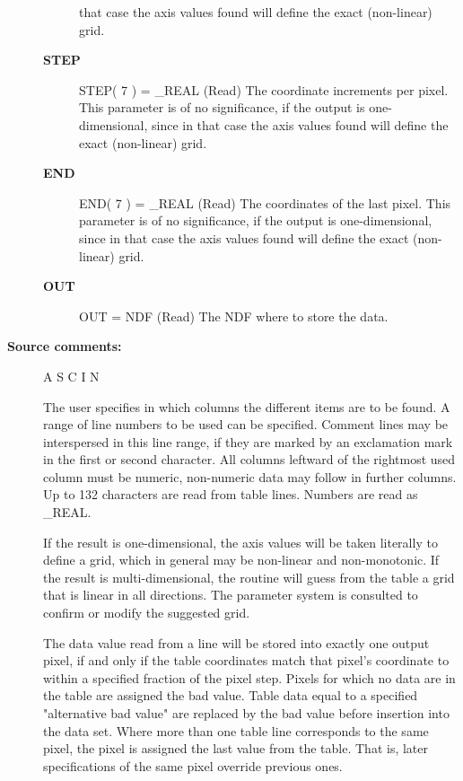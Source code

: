 \begin{description}
\begin{description}
   that case the axis values found will define the exact
   (non-linear) grid.
\item [\textbf{STEP}]
STEP( 7 ) = \_REAL (Read)
   The coordinate increments per pixel. This parameter is of
   no significance, if the output is one-dimensional, since in
   that case the axis values found will define the exact
   (non-linear) grid.
\item [\textbf{END}]
END( 7 ) = \_REAL (Read)
   The coordinates of the last pixel. This parameter is of
   no significance, if the output is one-dimensional, since in
   that case the axis values found will define the exact
   (non-linear) grid.
\item [\textbf{OUT}]
OUT = NDF (Read)
   The NDF where to store the data.

\end{description}

\item [\textbf{Source comments:}]
\begin{terminalv}
   A S C I N

   The user specifies in which columns the different items are to be
   found. A range of line numbers to be used can be specified.
   Comment lines may be interspersed in this line range, if they are
   marked by an exclamation mark in the first or second character.
   All columns leftward of the rightmost used column must be
   numeric, non-numeric data may follow in further columns.
   Up to 132 characters are read from table lines. Numbers are read
   as \_REAL.

   If the result is one-dimensional, the axis values will be taken
   literally to define a grid, which in general may be non-linear and
   non-monotonic. If the result is multi-dimensional, the routine
   will guess from the table a grid that is linear in all directions.
   The parameter system is consulted to confirm or modify the
   suggested grid.

   The data value read from a line will be stored into exactly one
   output pixel, if and only if the table coordinates match that
   pixel's coordinate to within a specified fraction of the pixel
   step. Pixels for which no data are in the table are assigned the
   bad value. Table data equal to a specified "alternative bad value"
   are replaced by the bad value before insertion into the data set.
   Where more than one table line corresponds to the same pixel, the
   pixel is assigned the last value from the table. That is, later
   specifications of the same pixel override previous ones.


\end{terminalv}
\end{description}
